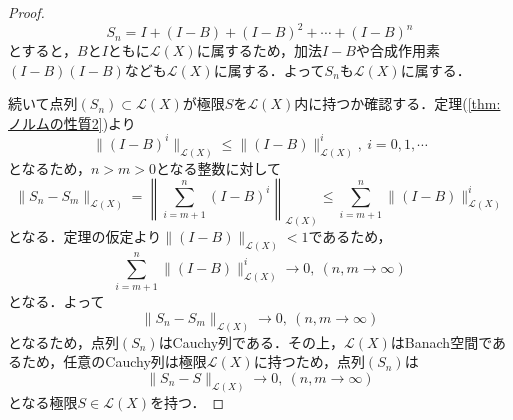 \documentclass[11pt,a4paper,titlepage]{jsreport}
\theoremstyle{definition}
\begin{document}
\begin{proof}
  \begin{equation*}
    S_n = I + (I-B) + (I-B)^2 + \cdots + (I-B)^n
  \end{equation*}
  とすると，$B$と$I$ともに$\mathcal{L}(X)$に属するため，加法$I-B$や合成作用素$(I-B)(I-B)$なども$\mathcal{L}(X)$に属する．よって$S_n$も$\mathcal{L}(X)$に属する．

  続いて点列$(S_n)\subset\mathcal{L}(X)$が極限$S$を$\mathcal{L}(X)$内に持つか確認する．定理(\ref{thm:ノルムの性質2})より
  \begin{equation*}
    \|(I-B)^i\|_{\mathcal{L}(X)} \leq \|(I-B)\|_{\mathcal{L}(X)}^i,\ i=0,1,\cdots
  \end{equation*}
  となるため，$n>m>0$となる整数に対して
  \begin{equation*}
    \|S_n-S_m\|_{\mathcal{L}(X)} = \left \| \sum^n_{i=m+1}(I-B)^i \right \| _{\mathcal{L}(X)} \leq \sum^n_{i=m+1}\|(I-B)\|^i_{\mathcal{L}(X)}
  \end{equation*}
  となる．定理の仮定より$\|(I-B)\|_{\mathcal{L}(X)}<1$であるため，
  \begin{equation*}
    \sum^n_{i=m+1}\|(I-B)\|^i_{\mathcal{L}(X)} \rightarrow 0,\ (n,m\rightarrow \infty)
  \end{equation*}
  となる．よって
  \begin{equation*}
    \|S_n-S_m\|_{\mathcal{L}(X)} \rightarrow 0,\ (n,m\rightarrow \infty)
  \end{equation*}
  となるため，点列$(S_n)$はCauchy列である．その上，$\mathcal{L}(X)$はBanach空間であるため，任意のCauchy列は極限$\mathcal{L}(X)$に持つため，点列$(S_n)$は
  \begin{equation*}
    \|S_n-S\|_{\mathcal{L}(X)} \rightarrow 0,\ (n,m\rightarrow \infty)
  \end{equation*}
  となる極限$S\in\mathcal{L}(X)$を持つ．


\end{proof}
\end{document}
